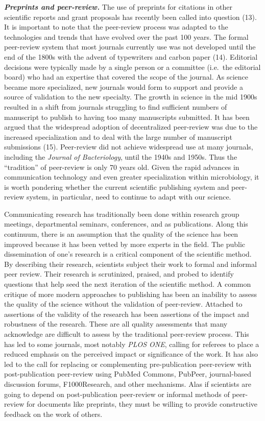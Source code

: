 \documentclass[11pt,]{article}
\begin{document}
\textbf{\emph{Preprints and peer-review.}} The use of preprints for
citations in other scientific reports and grant proposals has recently
been called into question (13). It is important to note that the
peer-review process was adapted to the technologies and trends that have
evolved over the past 100 years. The formal peer-review system that most
journals currently use was not developed until the end of the 1800s with
the advent of typewriters and carbon paper (14). Editorial decisions
were typically made by a single person or a committee (i.e.~the
editorial board) who had an expertise that covered the scope of the
journal. As science became more specialized, new journals would form to
support and provide a source of validation to the new specialty. The
growth in science in the mid 1900s resulted in a shift from journals
struggling to find sufficient numbers of manuscript to publish to having
too many manuscripts submitted. It has been argued that the widespread
adoption of decentralized peer-review was due to the increased
specialization and to deal with the large number of manuscript
submissions (15). Peer-review did not achieve widespread use at many
journals, including the \emph{Journal of Bacteriology}, until the 1940s
and 1950s. Thus the ``tradition'' of peer-review is only 70 years old.
Given the rapid advances in communication technology and even greater
specialization within microbiology, it is worth pondering whether the
current scientific publishing system and peer-review system, in
particular, need to continue to adapt with our science.

Communicating research has traditionally been done within research group
meetings, departmental seminars, conferences, and as publications. Along
this continuum, there is an assumption that the quality of the science
has been improved because it has been vetted by more experts in the
field. The public dissemination of one's research is a critical
component of the scientific method. By describing their research,
scientists subject their work to formal and informal peer review. Their
research is scrutinized, praised, and probed to identify questions that
help seed the next iteration of the scientific method. A common critique
of more modern approaches to publishing has been an inability to assess
the quality of the science without the validation of peer-review.
Attached to assertions of the validity of the research has been
assertions of the impact and robustness of the research. These are all
quality assessments that many acknowledge are difficult to assess by the
traditional peer-review process. This has led to some journals, most
notably \emph{PLOS ONE}, calling for referees to place a reduced
emphasis on the perceived impact or significance of the work. It has
also led to the call for replacing or complementing pre-publication
peer-review with post-publication peer-review using PubMed Commons,
PubPeer, journal-based discussion forums, F1000Research, and other
mechanisms. Alas if scientists are going to depend on post-publication
peer-review or informal methods of peer-review for documents like
preprints, they must be willing to provide constructive feedback on the
work of others.
\end{document}
